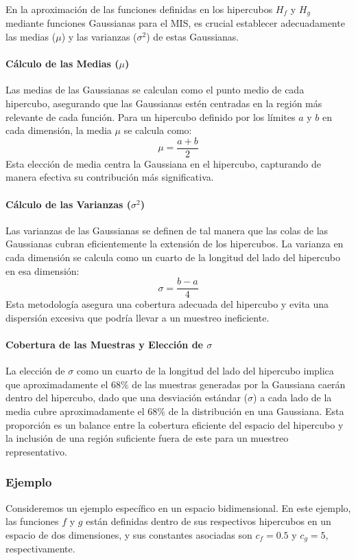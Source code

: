 \documentclass{article}
\begin{document}
En la aproximación de las funciones definidas en los hipercubos \( H_f \) y \( H_g \) mediante funciones Gaussianas para el MIS, es crucial establecer adecuadamente las medias (\( \mu \)) y las varianzas (\( \sigma^2 \)) de estas Gaussianas.

\paragraph{Cálculo de las Medias (\( \mu \))}
Las medias de las Gaussianas se calculan como el punto medio de cada hipercubo, asegurando que las Gaussianas estén centradas en la región más relevante de cada función. Para un hipercubo definido por los límites \( a \) y \( b \) en cada dimensión, la media \( \mu \) se calcula como:
$$
    \mu = \frac{a + b}{2}
$$
Esta elección de media centra la Gaussiana en el hipercubo, capturando de manera efectiva su contribución más significativa.

\paragraph{Cálculo de las Varianzas (\( \sigma^2 \))}
Las varianzas de las Gaussianas se definen de tal manera que las colas de las Gaussianas cubran eficientemente la extensión de los hipercubos. La varianza en cada dimensión se calcula como un cuarto de la longitud del lado del hipercubo en esa dimensión:
$$
    \sigma = \frac{b - a}{4}
$$
Esta metodología asegura una cobertura adecuada del hipercubo y evita una dispersión excesiva que podría llevar a un muestreo ineficiente.

\paragraph{Cobertura de las Muestras y Elección de \( \sigma \)}
La elección de \( \sigma \) como un cuarto de la longitud del lado del hipercubo implica que aproximadamente el 68\% de las muestras generadas por la Gaussiana caerán dentro del hipercubo, dado que una desviación estándar (\( \sigma \)) a cada lado de la media cubre aproximadamente el 68\% de la distribución en una Gaussiana. Esta proporción es un balance entre la cobertura eficiente del espacio del hipercubo y la inclusión de una región suficiente fuera de este para un muestreo representativo.

\subsubsection{Ejemplo}
Consideremos un ejemplo específico en un espacio bidimensional. En este ejemplo, las funciones \( f \) y \( g \) están definidas dentro de sus respectivos hipercubos en un espacio de dos dimensiones, y sus constantes asociadas son \( c_f = 0.5 \) y \( c_g = 5 \), respectivamente.
\end{document}
